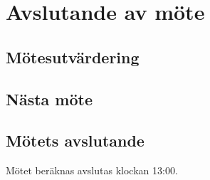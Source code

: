 \documentclass[protokoll]{dvd}
\begin{document}
\section{Avslutande av möte}

\subsection{Mötesutvärdering}

\subsection{Nästa möte}

\subsection{Mötets avslutande}

Mötet beräknas avslutas klockan 13:00.

\styrelsesignaturer
\end{document}
